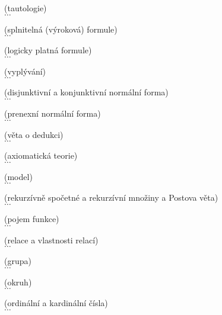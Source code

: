 

\begin{definition}{(tautologie)}\\
$\ldots$
\end{definition}

\begin{definition}{(splnitelná (výroková) formule)}\\
$\ldots$
\end{definition}

\begin{definition}{(logicky platná formule)}\\
$\ldots$
\end{definition}

\begin{definition}{(vyplývání)}\\
$\ldots$
\end{definition}

\begin{definition}{(disjunktivní a konjunktivní normální forma)}\\
$\ldots$
\end{definition}

\begin{definition}{(prenexní normální forma)}\\
$\ldots$
\end{definition}

\begin{definition}{(věta o dedukci)}\\
$\ldots$
\end{definition}

\begin{definition}{(axiomatická teorie)}\\
$\ldots$
\end{definition}

\begin{definition}{(model)}\\
$\ldots$
\end{definition}

\begin{definition}{(rekurzívně spočetné a rekurzívní množiny a Postova věta)}\\
$\ldots$
\end{definition}

\begin{definition}{(pojem funkce)}\\
$\ldots$
\end{definition}

\begin{definition}{(relace a vlastnosti relací)}\\
$\ldots$
\end{definition}

\begin{definition}{(grupa)}\\
$\ldots$
\end{definition}

\begin{definition}{(okruh)}\\
$\ldots$
\end{definition}

\begin{definition}{(ordinální a kardinální čísla)}\\
$\ldots$
\end{definition}

